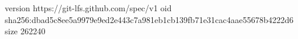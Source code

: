 version https://git-lfs.github.com/spec/v1
oid sha256:dbad5c8ee5a9979e9ed2e443c7a981eb1cb139fb71e31cac4aae55678b4222d6
size 262240

